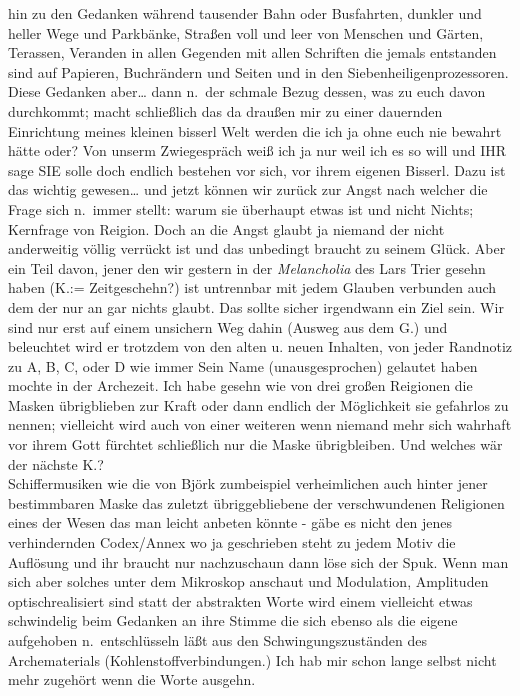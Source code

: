 \documentclass[
]{article}
\begin{document}
hin zu den Gedanken während tausender Bahn oder Busfahrten, dunkler und
heller Wege und Parkbänke, Straßen voll und leer von Menschen und
Gärten, Terassen, Veranden in allen Gegenden mit allen Schriften die
jemals entstanden sind auf Papieren, Buchrändern und Seiten und in den
Siebenheiligenprozessoren. Diese Gedanken aber\ldots{} dann n.~der
schmale Bezug dessen, was zu euch davon durchkommt; macht schließlich
das da draußen mir zu einer dauernden Einrichtung meines kleinen bisserl
Welt werden die ich ja ohne euch nie bewahrt hätte oder? Von unserm
Zwiegespräch weiß ich ja nur weil ich es so will und IHR sage SIE solle
doch endlich bestehen vor sich, vor ihrem eigenen Bisserl. Dazu ist das
wichtig gewesen\ldots{} und jetzt können wir zurück zur Angst nach
welcher die Frage sich n.~immer stellt: warum sie überhaupt etwas ist
und nicht Nichts; Kernfrage von Reigion. Doch an die Angst glaubt ja
niemand der nicht anderweitig völlig verrückt ist und das unbedingt
braucht zu seinem Glück. Aber ein Teil davon, jener den wir gestern in
der \emph{Melancholia} des Lars Trier gesehn haben (K.:= Zeitgeschehn?)
ist untrennbar mit jedem Glauben verbunden auch dem der nur an gar
nichts glaubt. Das sollte sicher irgendwann ein Ziel sein. Wir sind nur
erst auf einem unsichern Weg dahin (Ausweg aus dem G.) und beleuchtet
wird er trotzdem von den alten u. neuen Inhalten, von jeder Randnotiz zu
A, B, C, oder D wie immer Sein Name (unausgesprochen) gelautet haben
mochte in der Archezeit. Ich habe gesehn wie von drei großen Reigionen
die Masken übrigblieben zur Kraft oder dann endlich der Möglichkeit sie
gefahrlos zu nennen; vielleicht wird auch von einer weiteren wenn
niemand mehr sich wahrhaft vor ihrem Gott fürchtet schließlich nur die
Maske übrigbleiben. Und welches wär der nächste K.?\\
Schiffermusiken wie die von Björk zumbeispiel verheimlichen auch hinter
jener bestimmbaren Maske das zuletzt übriggebliebene der verschwundenen
Religionen eines der Wesen das man leicht anbeten könnte - gäbe es nicht
den jenes verhindernden Codex/Annex wo ja geschrieben steht zu jedem
Motiv die Auflösung und ihr braucht nur nachzuschaun dann löse sich der
Spuk. Wenn man sich aber solches unter dem Mikroskop anschaut und
Modulation, Amplituden optischrealisiert sind statt der abstrakten Worte
wird einem vielleicht etwas schwindelig beim Gedanken an ihre Stimme die
sich ebenso als die eigene aufgehoben n.~entschlüsseln läßt aus den
Schwingungszuständen des Archematerials (Kohlenstoffverbindungen.) Ich
hab mir schon lange selbst nicht mehr zugehört wenn die Worte ausgehn.
\end{document}
